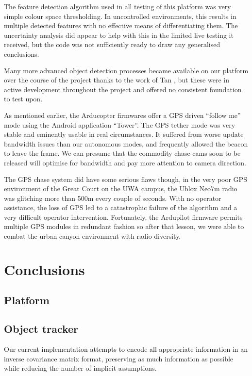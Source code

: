 \documentclass{article}
\newcounter{subsubsubsection}[subsubsection]
\begin{document}
        The feature detection algorithm used in all testing of this platform was very simple colour space thresholding.  In uncontrolled environments, this results in multiple detected features with no effective means of differentiating them.  The uncertainty analysis did appear to help with this in the limited live testing it received, but the code was not sufficiently ready to draw any generalised conclusions.

        Many more advanced object detection processes became available on our platform over the course of the project thanks to the work of Tan \cite{Tan}, but these were in active development throughout the project and offered no consistent foundation to test upon.

        As mentioned earlier, the Arducopter firmwares offer a GPS driven ``follow me'' mode using the Android application ``Tower''. %
        The GPS tether mode was very stable and eminently usable in real circumstances.  It suffered from worse update bandwidth issues than our autonomous modes, and frequently allowed the beacon to leave the frame.  We can presume that the commodity chase-cams soon to be released will optimise for bandwidth and pay more attention to camera direction.

        The GPS chase system did have some serious flaws though, in the very poor GPS environment of the Great Court on the UWA campus, the Ublox Neo7m radio was glitching more than 500m every couple of seconds.  With no operator assistance, the loss of GPS led to a catastrophic failure of the algorithm and a very difficult operator intervention.  Fortunately, the Ardupilot firmware permits multiple GPS modules in redundant fashion so after that lesson, we were able to combat the urban canyon environment with radio diversity.






\section{Conclusions}
  \subsection{Platform}
  \subsection{Object tracker}
    Our current implementation attempts to encode all appropriate information in an inverse covariance matrix format, preserving as much information as possible while reducing the number of implicit assumptions.
\end{document}

